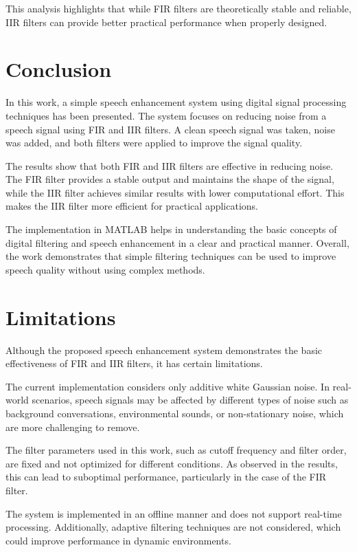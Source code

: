 \documentclass[conference]{IEEEtran}
\begin{document}
This analysis highlights that while FIR filters are theoretically stable and reliable, IIR filters can provide better practical performance when properly designed.

\section{Conclusion}

In this work, a simple speech enhancement system using digital signal processing techniques has been presented. The system focuses on reducing noise from a speech signal using FIR and IIR filters. A clean speech signal was taken, noise was added, and both filters were applied to improve the signal quality.

The results show that both FIR and IIR filters are effective in reducing noise. The FIR filter provides a stable output and maintains the shape of the signal, while the IIR filter achieves similar results with lower computational effort. This makes the IIR filter more efficient for practical applications.

The implementation in MATLAB helps in understanding the basic concepts of digital filtering and speech enhancement in a clear and practical manner. Overall, the work demonstrates that simple filtering techniques can be used to improve speech quality without using complex methods.

\section{Limitations}

Although the proposed speech enhancement system demonstrates the basic effectiveness of FIR and IIR filters, it has certain limitations.

The current implementation considers only additive white Gaussian noise. In real-world scenarios, speech signals may be affected by different types of noise such as background conversations, environmental sounds, or non-stationary noise, which are more challenging to remove.

The filter parameters used in this work, such as cutoff frequency and filter order, are fixed and not optimized for different conditions. As observed in the results, this can lead to suboptimal performance, particularly in the case of the FIR filter.

The system is implemented in an offline manner and does not support real-time processing. Additionally, adaptive filtering techniques are not considered, which could improve performance in dynamic environments.
\end{document}
